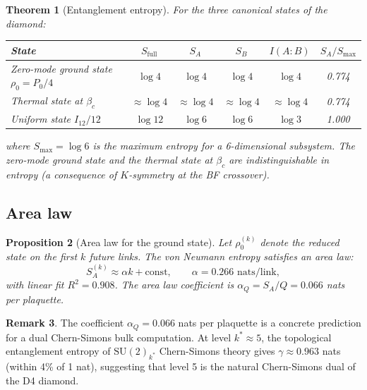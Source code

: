 \documentclass[12pt,a4paper]{article}
\theoremstyle{plain}
\newtheorem{theorem}{Theorem}[section]
\newtheorem{proposition}[theorem]{Proposition}
\theoremstyle{definition}
\newtheorem{remark}[theorem]{Remark}
\newcommand{\betac}{\beta_c}
\begin{document}
\begin{theorem}[Entanglement entropy]
\label{thm:entropy}
  For the three canonical states of the diamond:
  \begin{center}
  \begin{tabular}{lccccc}
  \toprule
  State & $S_{\mathrm{full}}$ & $S_A$ & $S_B$ & $I(A:B)$ & $S_A/S_{\max}$ \\
  \midrule
  Zero-mode ground state $\rho_0 = P_0/4$ &
    $\log 4$ & $\log 4$ & $\log 4$ & $\log 4$ & 0.774 \\
  Thermal state at $\betac$ &
    $\approx \log 4$ & $\approx \log 4$ & $\approx \log 4$ & $\approx \log 4$ & 0.774 \\
  Uniform state $I_{12}/12$ &
    $\log 12$ & $\log 6$ & $\log 6$ & $\log 3$ & 1.000 \\
  \bottomrule
  \end{tabular}
  \end{center}
  where $S_{\max} = \log 6$ is the maximum entropy for a 6-dimensional subsystem.
  The zero-mode ground state and the thermal state at $\betac$ are
  indistinguishable in entropy (a consequence of $K$-symmetry at the
  BF crossover).
\end{theorem}

\subsection{Area law}

\begin{proposition}[Area law for the ground state]
  Let $\rho_0^{(k)}$ denote the reduced state on the first $k$ future links.
  The von Neumann entropy satisfies an area law:
  \begin{equation}
    S_A^{(k)} \approx \alpha k + \text{const}, \qquad \alpha = 0.266 \text{ nats/link},
  \end{equation}
  with linear fit $R^2 = 0.908$.  The area law coefficient is
  $\alpha_Q = S_A / Q = 0.066$ nats per plaquette.
\end{proposition}

\begin{remark}
  The coefficient $\alpha_Q = 0.066$ nats per plaquette is a concrete
  prediction for a dual Chern-Simons bulk computation.  At level
  $k^* \approx 5$, the topological entanglement entropy of
  $\mathrm{SU}(2)_{k^*}$ Chern-Simons theory gives $\gamma \approx 0.963$
  nats (within 4\% of 1 nat), suggesting that level 5 is the natural
  Chern-Simons dual of the D4 diamond.
\end{remark}
\end{document}
